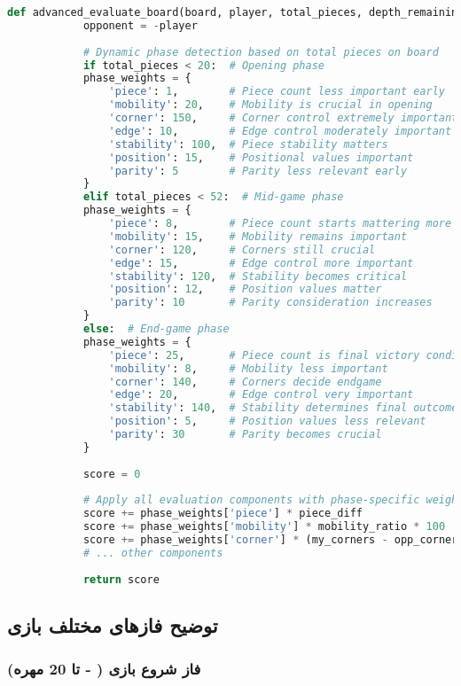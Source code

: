 \documentclass[12pt]{article}
\newenvironment{ltrcode}{\lr\bgroup}{\egroup}
\begin{document}
	\begin{ltrcode}
		\begin{lstlisting}[language=Python, caption=Dynamic Phase Detection and Weighting]
			def advanced_evaluate_board(board, player, total_pieces, depth_remaining=0):
			opponent = -player
			
			# Dynamic phase detection based on total pieces on board
			if total_pieces < 20:  # Opening phase
			phase_weights = {
				'piece': 1,        # Piece count less important early
				'mobility': 20,    # Mobility is crucial in opening
				'corner': 150,     # Corner control extremely important
				'edge': 10,        # Edge control moderately important
				'stability': 100,  # Piece stability matters
				'position': 15,    # Positional values important
				'parity': 5        # Parity less relevant early
			}
			elif total_pieces < 52:  # Mid-game phase
			phase_weights = {
				'piece': 8,        # Piece count starts mattering more
				'mobility': 15,    # Mobility remains important
				'corner': 120,     # Corners still crucial
				'edge': 15,        # Edge control more important
				'stability': 120,  # Stability becomes critical
				'position': 12,    # Position values matter
				'parity': 10       # Parity consideration increases
			}
			else:  # End-game phase
			phase_weights = {
				'piece': 25,       # Piece count is final victory condition
				'mobility': 8,     # Mobility less important
				'corner': 140,     # Corners decide endgame
				'edge': 20,        # Edge control very important
				'stability': 140,  # Stability determines final outcome
				'position': 5,     # Position values less relevant
				'parity': 30       # Parity becomes crucial
			}
			
			score = 0
			
			# Apply all evaluation components with phase-specific weights
			score += phase_weights['piece'] * piece_diff
			score += phase_weights['mobility'] * mobility_ratio * 100
			score += phase_weights['corner'] * (my_corners - opp_corners)
			# ... other components
			
			return score
		\end{lstlisting}
	\end{ltrcode}
	
	\subsection{توضیح فازهای مختلف بازی}
	
	\subsubsection{فاز شروع بازی ( - تا 20 مهره)}
	
\end{document}
